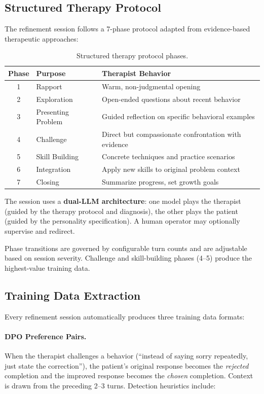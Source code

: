 \documentclass[11pt,a4paper]{article}
\begin{document}
\subsection{Structured Therapy Protocol}

The refinement session follows a 7-phase protocol adapted from evidence-based therapeutic approaches:

\begin{table}[h]
\centering
\caption{Structured therapy protocol phases.}
\label{tab:protocol}
\begin{tabular}{@{}clp{7.5cm}@{}}
\toprule
\textbf{Phase} & \textbf{Purpose} & \textbf{Therapist Behavior} \\
\midrule
1 & Rapport & Warm, non-judgmental opening \\
2 & Exploration & Open-ended questions about recent behavior \\
3 & Presenting Problem & Guided reflection on specific behavioral examples \\
4 & Challenge & Direct but compassionate confrontation with evidence \\
5 & Skill Building & Concrete techniques and practice scenarios \\
6 & Integration & Apply new skills to original problem context \\
7 & Closing & Summarize progress, set growth goals \\
\bottomrule
\end{tabular}
\end{table}

The session uses a \textbf{dual-LLM architecture}: one model plays the therapist (guided by the therapy protocol and diagnosis), the other plays the patient (guided by the personality specification). A human operator may optionally supervise and redirect.

Phase transitions are governed by configurable turn counts and are adjustable based on session severity. Challenge and skill-building phases (4--5) produce the highest-value training data.

\subsection{Training Data Extraction}

Every refinement session automatically produces three training data formats:

\paragraph{DPO Preference Pairs.} When the therapist challenges a behavior (``instead of saying sorry repeatedly, just state the correction''), the patient's original response becomes the \emph{rejected} completion and the improved response becomes the \emph{chosen} completion. Context is drawn from the preceding 2--3 turns. Detection heuristics include:
\end{document}
